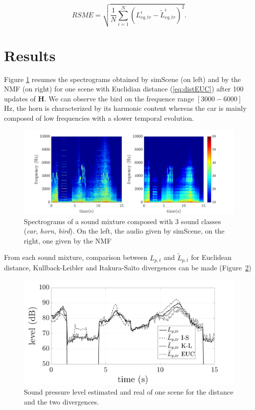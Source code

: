 \documentclass{article}
\begin{document}
\begin{sloppy}
\begin{equation}
RSME = \sqrt{\frac{1}{N}\sum_{i = 1}^N(L^i_{eq,tr}-\tilde{L}^i_{eq,tr})^2}.
\end{equation}

\section{Results}\label{sec:results}

Figure \ref{fig:spectrogram} resumes the spectrograms obtained by simScene (on left) and by the NMF (on right) for one scene with Euclidian distance (\ref{eq:distEUC}) after 100 updates of $\mathbf{H}$. We can observe the bird on the frequence range $\left[3000-6000\right]$ Hz, the horn is characterized by its harmonic content whereas the car is mainly composed of low frequencies with a slower temporal evolution.

\begin{figure}[t]
\centering
\includegraphics[scale=0.30]{images/bvak_Sc2_Vapprox_spectre_Euc.pdf}
\caption{Spectrograms of a sound mixture composed with 3 sound classes (\textit{car}, \textit{horn}, \textit{bird}). On the left, the audio given by simScene, on the right, one given by the NMF}
\label{fig:spectrogram}
\end{figure}


From each sound mixture, comparison between $L_{p,t}$ and $\tilde{L}_{p,t}$ for Euclidean distance, Kullback-Leibler and Itakura-Saïto divergences can be made (Figure~\ref{fig:Lp})\\

\begin{figure}[t]
\centering
\centerline{\includegraphics[scale=0.30]{images/Lp_bvak_Sc2_It100_nbCl3.pdf}}
\caption{Sound pressure level estimated and real of one scene for the distance and the two divergences.}
\label{fig:Lp}
\end{figure}


\end{sloppy}
\end{document}
